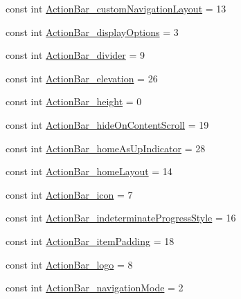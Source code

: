 \begin{DoxyCompactItemize}
\item 
const int \mbox{\hyperlink{class_f_w_p_s___app_1_1_droid_1_1_resource_1_1_styleable_af9984626336ba49bb757431c29e32c57}{Action\+Bar\+\_\+custom\+Navigation\+Layout}} = 13
\item 
const int \mbox{\hyperlink{class_f_w_p_s___app_1_1_droid_1_1_resource_1_1_styleable_abf55bf0090bd8f0be5967ef57a56d9a5}{Action\+Bar\+\_\+display\+Options}} = 3
\item 
const int \mbox{\hyperlink{class_f_w_p_s___app_1_1_droid_1_1_resource_1_1_styleable_a94f15326267805c500f40e2b6ae4141b}{Action\+Bar\+\_\+divider}} = 9
\item 
const int \mbox{\hyperlink{class_f_w_p_s___app_1_1_droid_1_1_resource_1_1_styleable_aeed800aad6e81f14161e8d731f7e9773}{Action\+Bar\+\_\+elevation}} = 26
\item 
const int \mbox{\hyperlink{class_f_w_p_s___app_1_1_droid_1_1_resource_1_1_styleable_a749a8c51ae41c8a04471eb8b07fcfda3}{Action\+Bar\+\_\+height}} = 0
\item 
const int \mbox{\hyperlink{class_f_w_p_s___app_1_1_droid_1_1_resource_1_1_styleable_ad9c0f9671f9418838e651d05f2d387a4}{Action\+Bar\+\_\+hide\+On\+Content\+Scroll}} = 19
\item 
const int \mbox{\hyperlink{class_f_w_p_s___app_1_1_droid_1_1_resource_1_1_styleable_a87331b904a7746878a9e2f5ade0d7b70}{Action\+Bar\+\_\+home\+As\+Up\+Indicator}} = 28
\item 
const int \mbox{\hyperlink{class_f_w_p_s___app_1_1_droid_1_1_resource_1_1_styleable_a41f190a824a42f6b7b1658c6bb652949}{Action\+Bar\+\_\+home\+Layout}} = 14
\item 
const int \mbox{\hyperlink{class_f_w_p_s___app_1_1_droid_1_1_resource_1_1_styleable_aa836c8a31a821804923e80faa346b364}{Action\+Bar\+\_\+icon}} = 7
\item 
const int \mbox{\hyperlink{class_f_w_p_s___app_1_1_droid_1_1_resource_1_1_styleable_a4b3ba0084ea96676ce87c63989d600a0}{Action\+Bar\+\_\+indeterminate\+Progress\+Style}} = 16
\item 
const int \mbox{\hyperlink{class_f_w_p_s___app_1_1_droid_1_1_resource_1_1_styleable_a3da8ef82a9c7b221c03ffcfb7dbd3f1c}{Action\+Bar\+\_\+item\+Padding}} = 18
\item 
const int \mbox{\hyperlink{class_f_w_p_s___app_1_1_droid_1_1_resource_1_1_styleable_ac0bee86ba7f39e75c4a9c8625a9eed33}{Action\+Bar\+\_\+logo}} = 8
\item 
const int \mbox{\hyperlink{class_f_w_p_s___app_1_1_droid_1_1_resource_1_1_styleable_a95d40fbd236f07c529eba0b48549eb0c}{Action\+Bar\+\_\+navigation\+Mode}} = 2

\end{DoxyCompactItemize}
